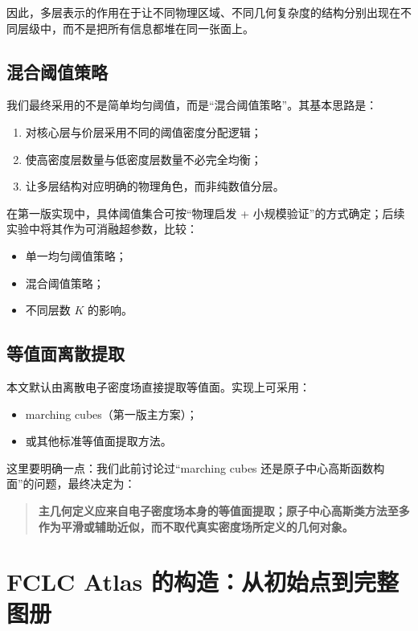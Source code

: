 \documentclass[12pt,a4paper]{ctexart}
\begin{document}
因此，多层表示的作用在于让不同物理区域、不同几何复杂度的结构分别出现在不同层级中，而不是把所有信息都堆在同一张面上。

\subsection{混合阈值策略}

我们最终采用的不是简单均匀阈值，而是“混合阈值策略”。其基本思路是：

\begin{enumerate}[leftmargin=2em]
    \item 对核心层与价层采用不同的阈值密度分配逻辑；
    \item 使高密度层数量与低密度层数量不必完全均衡；
    \item 让多层结构对应明确的物理角色，而非纯数值分层。
\end{enumerate}

在第一版实现中，具体阈值集合可按“物理启发 + 小规模验证”的方式确定；后续实验中将其作为可消融超参数，比较：
\begin{itemize}[leftmargin=2em]
    \item 单一均匀阈值策略；
    \item 混合阈值策略；
    \item 不同层数 \(K\) 的影响。
\end{itemize}

\subsection{等值面离散提取}

本文默认由离散电子密度场直接提取等值面。实现上可采用：
\begin{itemize}[leftmargin=2em]
    \item marching cubes（第一版主方案）；
    \item 或其他标准等值面提取方法。
\end{itemize}

这里要明确一点：我们此前讨论过“marching cubes 还是原子中心高斯函数构面”的问题，最终决定为：

\begin{quote}
\textbf{主几何定义应来自电子密度场本身的等值面提取；原子中心高斯类方法至多作为平滑或辅助近似，而不取代真实密度场所定义的几何对象。}
\end{quote}

\section{FCLC Atlas 的构造：从初始点到完整图册}
\end{document}
